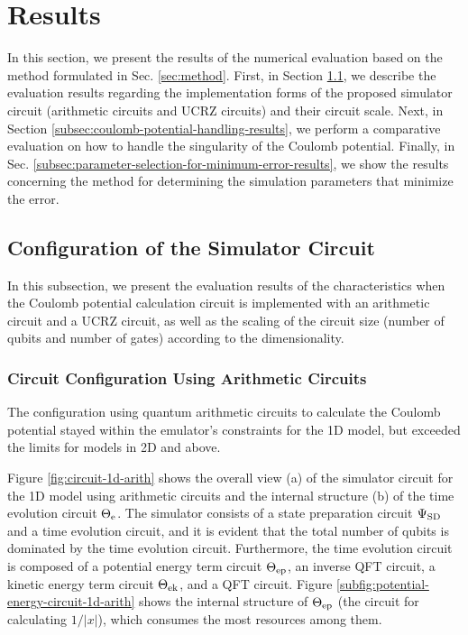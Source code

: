 \documentclass[wabun2025.tex]{subfiles}
\begin{document}
\section{Results}
In this section, we present the results of the numerical evaluation based on the
method formulated in Sec. \ref{sec:method}. First, in Section
\ref{subsec:circuit-configuration-results}, we describe the evaluation results
regarding the implementation forms of the proposed simulator circuit (arithmetic
circuits and UCRZ circuits) and their circuit scale. Next, in Section
\ref{subsec:coulomb-potential-handling-results}, we perform a comparative
evaluation on how to handle the singularity of the Coulomb potential. Finally,
in Sec. \ref{subsec:parameter-selection-for-minimum-error-results}, we show
the results concerning the method for determining the simulation parameters that
minimize the error.

\subsection{Configuration of the Simulator Circuit}
\label{subsec:circuit-configuration-results}
In this subsection, we present the evaluation results of the characteristics
when the Coulomb potential calculation circuit is implemented with an arithmetic
circuit and a UCRZ circuit, as well as the scaling of the circuit size (number
of qubits and number of gates) according to the dimensionality.

\subsubsection{Circuit Configuration Using Arithmetic Circuits}
\label{subsubsec:arithmetic-circuit-configuration-results}
The configuration using quantum arithmetic circuits to calculate the Coulomb
potential stayed within the emulator's constraints for the 1D model, but
exceeded the limits for models in 2D and above.

Figure \ref{fig:circuit-1d-arith} shows the overall view (a) of the simulator
circuit for the 1D model using arithmetic circuits and the internal structure
(b) of the time evolution circuit $\Theta_{\mathrm{e}}$. The simulator consists of a state
preparation circuit $\Psi_{\mathrm{SD}}$ and a time evolution circuit, and it is evident
that the total number of qubits is dominated by the time evolution circuit.
Furthermore, the time evolution circuit is composed of a potential energy term
circuit $\Theta_{\mathrm{ep}}$, an inverse QFT circuit, a kinetic energy term circuit
$\Theta_{\mathrm{ek}}$, and a QFT circuit. Figure
\ref{subfig:potential-energy-circuit-1d-arith} shows the internal structure of
$\Theta_{\mathrm{ep}}$ (the circuit for calculating $1/|x|$), which consumes the most
resources among them.
\end{document}

